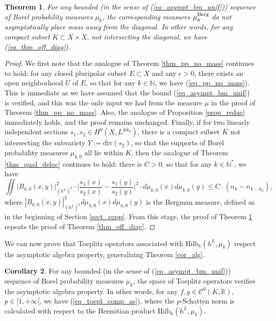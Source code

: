 \documentclass[12pt]{article}
\numberwithin{equation}{section}
\theoremstyle{theorem}
\newtheorem{thm}{Theorem}[section]
\theoremstyle{definition}
\newtheorem{cor}[thm]{Corollary}
\theoremstyle{remark}
\newcommand{\real}{\mathbb{R}}
\newcommand{\nat}{\mathbb{N}}
\newcommand{\ccal}{\mathscr{C}}
\begin{document}
	\par 
	\begin{thm}\label{thm_off_diag_gen}
		For any bounded (in the sense of (\ref{eq_asympt_bm_unif})) sequence of Borel probability measures $\mu_k$, the corresponding measures $\mu_k^{\rm{Berg}}$ do not asymptotically place mass away from the diagonal.
		In other words, for any compact subset $K \subset X \times X$, not intersecting the diagonal, we have (\ref{eq_thm_off_diag}).
	\end{thm}
	\begin{proof}
		We first note that the analogue of Theorem \ref{thm_pp_no_mass} continues to hold: for any closed pluripolar subset $E \subset X$ and any $\epsilon > 0$, there exists an open neighborhood $U$ of $E$, so that for any $k \in \nat$, we have (\ref{eq_pp_no_mass}).
		This is immediate as we have assumed that the bound (\ref{eq_asympt_bm_unif}) is verified, and this was the only input we had from the measure $\mu$ in the proof of Theorem \ref{thm_pp_no_mass}.
		Also, the analogue of Proposition \ref{prop_reduc} immediately holds, and the proof remains unchanged.
		Finally, if for two linearly independent sections $s_1, s_2 \in H^0(X, L^{\otimes k_0})$, there is a compact subset $K$ not intersecting the subvariety $Y := {\textrm{div}}(s_2)$, so that the supports of Borel probability measures $\mu_{k, 0}$ all lie within $K$, then the analogue of Theorem \ref{thm_qual_deloc} continues to hold: there is $C > 0$, so that for any $k \in \nat^*$, we have
		\begin{equation}\label{eq_thm_qual_deloc_gen}
			\iint \big|B_{k, 0}(x, y)\big|^2_{(h^L)^k} \cdot \Big| \frac{s_1(x)}{s_2(x)} - \frac{s_1(y)}{s_2(y)} \Big|^2 \cdot d \mu_{k, 0}(x) d \mu_{k, 0} (y)
			\leq 
			C \cdot (n_k - n_{k - k_0}),
		\end{equation}
		where $|B_{k, 0} (x, y)|^2_{(h^L)^k} d \mu_{k, 0}(x) d \mu_{k, 0} (y)$ is the Bergman measure, defined as in the beginning of Section \ref{sect_supp}.
		From this stage, the proof of Theorem \ref{thm_off_diag_gen} repeats the proof of Theorem \ref{thm_off_diag}.
	\end{proof}
	\par 
	We can now prove that Toeplitz operators associated with ${\textrm{Hilb}}_k(h^L, \mu_k)$ respect the asymptotic algebra property, generalizing Theorem \ref{cor_alg}.
	\begin{cor}\label{cor_alg_gen}
		For any bounded (in the sense of (\ref{eq_asympt_bm_unif})) sequence of Borel probability measures $\mu_k$, the space of Toeplitz operators verifies the asymptotic algebra property.
		In other words, for any $f, g \in \ccal^0(K, \real)$, $p \in [1, +\infty[$, we have (\ref{eq_toepl_comp_as}), where the $p$-Schatten norm is calculated with respect to the Hermitian product ${\textrm{Hilb}}_k(h^L, \mu_k)$.
	\end{cor}
\end{document}
